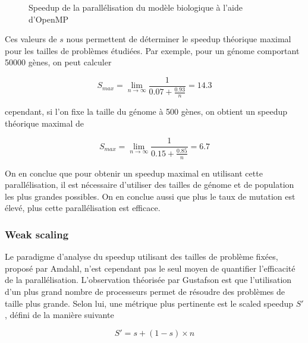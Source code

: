 \documentclass[a4paper, 10pt, twoside]{article}
\begin{document}
\begin{figure}[htb]
\begin{minipage}{0.32\textwidth}
	\end{minipage}
	\caption{Speedup de la parallélisation du modèle biologique à l'aide d'OpenMP}
	\label{fig:speedup/omp}
\end{figure}

Ces valeurs de $s$ nous permettent de déterminer le speedup théorique maximal pour les tailles de problèmes étudiées. Par exemple, pour un génome comportant 50000 gènes, on peut calculer

$$ S_{max} = \lim_{n\to\infty} \frac{1}{0.07 + \frac{0.93}{n}} = 14.3 $$

cependant, si l'on fixe la taille du génome à 500 gènes, on obtient un speedup théorique maximal de

$$ S_{max} = \lim_{n\to\infty} \frac{1}{0.15 + \frac{0.85}{n}} = 6.7 $$

On en conclue que pour obtenir un speedup maximal en utilisant cette parallélisation, il est nécessaire d'utiliser des tailles de génome et de population les plus grandes possibles. On en conclue aussi que plus le taux de mutation est élevé, plus cette parallélisation est efficace.

\subsubsection*{Weak scaling}

Le paradigme d'analyse du speedup utilisant des tailles de problème fixées, proposé par Amdahl, n'est cependant pas le seul moyen de quantifier l'efficacité de la parallélisation. L'observation théorisée par Gustafson \cite{gustafson} est que l'utilisation d'un plus grand nombre de processeurs permet de résoudre des problèmes de taille plus grande. Selon lui, une métrique plus pertinente est le scaled speedup $S'$, défini de la manière suivante

$$ S' = s + (1 - s) \times n$$
\end{document}
